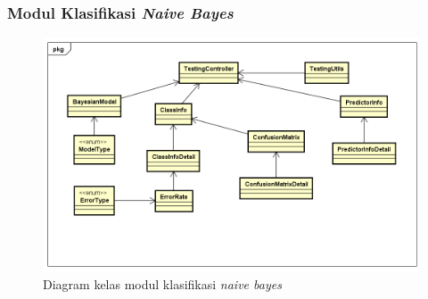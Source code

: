 \subsubsection{Modul Klasifikasi \textit{Naive Bayes}}
\begin{figure}[H]
	\centering
	\includegraphics[scale=0.65]{ClassDiagram/Simple_CD_Klasifikasi}
	\caption[Diagram kelas modul klasifikasi \textit{naive bayes}]{Diagram kelas modul klasifikasi \textit{naive bayes}}
	\label{fig:Diagram kelas modul klasifikasi naive bayes}
\end{figure}

